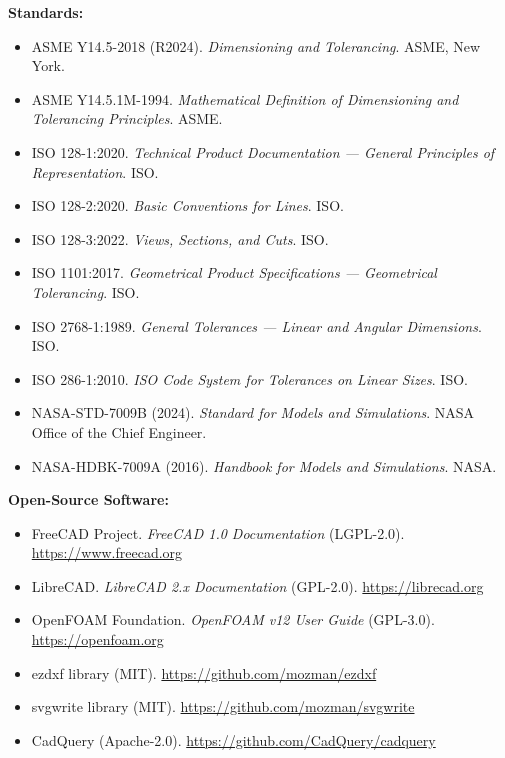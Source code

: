 \documentclass[11pt,letterpaper]{article}
\newcommand{\stageheader}[2]{%
  \noindent\colorbox{#2}{\makebox[\textwidth][l]{%
    \textcolor{white}{\bfseries\sffamily\hspace{6pt}#1\hspace{6pt}}}}%
  \vspace{0.5em}\par%
}
\begin{document}
\textbf{Standards:}
\begin{itemize}[noitemsep]
  \item ASME Y14.5-2018 (R2024). \textit{Dimensioning and Tolerancing}. ASME, New York.
  \item ASME Y14.5.1M-1994. \textit{Mathematical Definition of Dimensioning and Tolerancing Principles}. ASME.
  \item ISO 128-1:2020. \textit{Technical Product Documentation --- General Principles of Representation}. ISO.
  \item ISO 128-2:2020. \textit{Basic Conventions for Lines}. ISO.
  \item ISO 128-3:2022. \textit{Views, Sections, and Cuts}. ISO.
  \item ISO 1101:2017. \textit{Geometrical Product Specifications --- Geometrical Tolerancing}. ISO.
  \item ISO 2768-1:1989. \textit{General Tolerances --- Linear and Angular Dimensions}. ISO.
  \item ISO 286-1:2010. \textit{ISO Code System for Tolerances on Linear Sizes}. ISO.
  \item NASA-STD-7009B (2024). \textit{Standard for Models and Simulations}. NASA Office of the Chief Engineer.
  \item NASA-HDBK-7009A (2016). \textit{Handbook for Models and Simulations}. NASA.
\end{itemize}

\textbf{Open-Source Software:}
\begin{itemize}[noitemsep]
  \item FreeCAD Project. \textit{FreeCAD 1.0 Documentation} (LGPL-2.0). \url{https://www.freecad.org}
  \item LibreCAD. \textit{LibreCAD 2.x Documentation} (GPL-2.0). \url{https://librecad.org}
  \item OpenFOAM Foundation. \textit{OpenFOAM v12 User Guide} (GPL-3.0). \url{https://openfoam.org}
  \item ezdxf library (MIT). \url{https://github.com/mozman/ezdxf}
  \item svgwrite library (MIT). \url{https://github.com/mozman/svgwrite}
  \item CadQuery (Apache-2.0). \url{https://github.com/CadQuery/cadquery}
\end{itemize}

\newpage
\stageheader{STAGE 3 --- MISSION PACKAGE}{tertiary}
\end{document}
